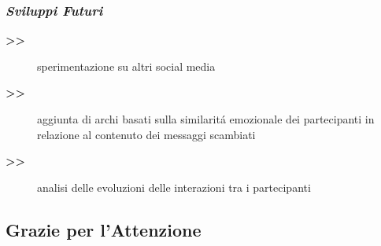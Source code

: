 \documentclass[11pt,xcolor={usenames,dvipsnames,svgnames},compress]{beamer}
\begin{document}
\begin{frame}
  \frametitle{\textcolor{lacamlilac}{\textbf{\emph{Sviluppi Futuri}}}}
  
  \begin{description}
  \item[\textbf{>>}] sperimentazione su altri social media
  \item[\textbf{>>}] aggiunta di archi basati sulla similarit{\'a} emozionale dei partecipanti in relazione al contenuto dei messaggi scambiati
  \item[\textbf{>>}] analisi delle evoluzioni delle interazioni tra i partecipanti 
  \end{description} \bigskip
  
\end{frame}

\begin{center}
\section{\huge{Grazie per l'Attenzione}}
{
  \begin{frame}
    \sectionpage 
  \end{frame}
}   
\end{center}
\end{document}
